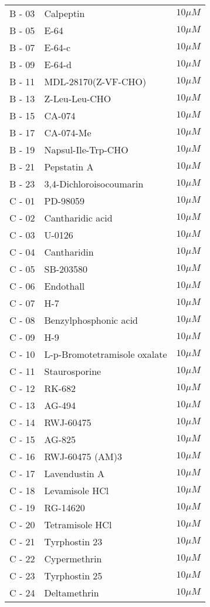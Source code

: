 \begin{center}
\begin{longtable}{|p{}|p{}|p{}|}
B - 03 & Calpeptin	& $10\mu M$ \\
B - 05 & E-64	& $10\mu M$ \\
B - 07 & E-64-c	& $10\mu M$ \\
B - 09 & E-64-d	& $10\mu M$ \\
B - 11 & MDL-28170(Z-VF-CHO)	& $10\mu M$ \\
B - 13 & Z-Leu-Leu-CHO	& $10\mu M$ \\
B - 15 & CA-074	& $10\mu M$ \\
B - 17 & CA-074-Me	& $10\mu M$ \\
B - 19 & Napsul-Ile-Trp-CHO	& $10\mu M$ \\
B - 21 & Pepstatin A	& $10\mu M$ \\
B - 23 & 3,4-Dichloroisocoumarin	& $10\mu M$ \\
C - 01 & PD-98059	& $10\mu M$ \\
C - 02 & Cantharidic acid	& $10\mu M$ \\
C - 03 & U-0126	& $10\mu M$ \\
C - 04 & Cantharidin	& $10\mu M$ \\
C - 05 & SB-203580	& $10\mu M$ \\
C - 06 & Endothall	& $10\mu M$ \\
C - 07 & H-7	& $10\mu M$ \\
C - 08 & Benzylphosphonic acid	& $10\mu M$ \\
C - 09 & H-9	& $10\mu M$ \\
C - 10 & L-p-Bromotetramisole oxalate	& $10\mu M$ \\
C - 11 & Staurosporine	& $10\mu M$ \\
C - 12 & RK-682	& $10\mu M$ \\
C - 13 & AG-494	& $10\mu M$ \\
C - 14 & RWJ-60475	& $10\mu M$ \\
C - 15 & AG-825	& $10\mu M$ \\
C - 16 & RWJ-60475 (AM)3	& $10\mu M$ \\
C - 17 & Lavendustin A	& $10\mu M$ \\
C - 18 & Levamisole HCl	& $10\mu M$ \\
C - 19 & RG-14620	& $10\mu M$ \\
C - 20 & Tetramisole HCl	& $10\mu M$ \\
C - 21 & Tyrphostin 23	& $10\mu M$ \\
C - 22 & Cypermethrin	& $10\mu M$ \\
C - 23 & Tyrphostin 25	& $10\mu M$ \\
C - 24 & Deltamethrin	& $10\mu M$ \\

\end{longtable}
\end{center}
